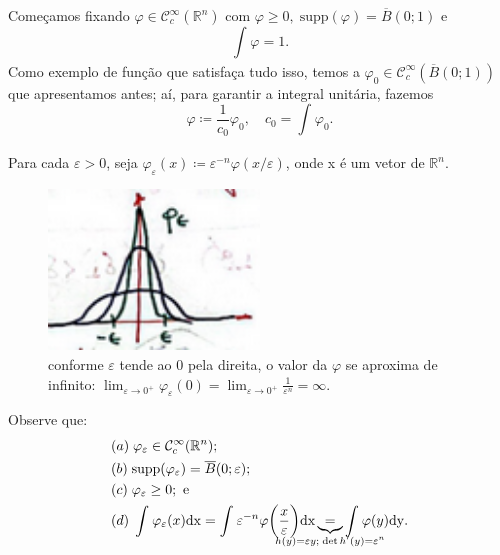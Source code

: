 \documentclass[../distribution_theory_notes.tex]{subfiles}
\begin{document}
 \begin{proof*}
   Começamos fixando \(\varphi \in \mathcal{C}_{c}^{\infty}(\mathbb{R}^{n})\) com \(\varphi \geq 0,\; \mathrm{supp}(\varphi )=\overline{B}(0;1)\) e 
     \[
       \int_{}^{}\varphi = 1.
     \]
     Como exemplo de função que satisfaça tudo isso, temos a \(\varphi_{0}\in \mathcal{C}_{c}^{\infty}(\overline{B}(0;1))\) que apresentamos antes; aí, para garantir a integral unitária, fazemos 
       \[
         \varphi \coloneqq \frac{1}{c_{0}}\varphi_{0},\quad c_{0}= \int_{}^{}\varphi_{0}.
       \]

       Para cada \(\varepsilon >0\), seja \(\varphi_{\varepsilon }(x)\coloneqq \varepsilon^{-n}\varphi(x/\varepsilon )\), onde x é um vetor de \(\mathbb{R}^{n}\). 
      \begin{figure}[H]
      \begin{center}
      \includegraphics[height=0.5\textheight, width=0.5\textwidth, keepaspectratio]{./Images/phi_epsilon_09.png}
      \end{center}
      \caption{conforme \(\varepsilon \) tende ao 0 pela direita, o valor da \(\varphi \) se aproxima de infinito: \(\lim_{\varepsilon \to 0^{+}}\varphi_{\varepsilon }(0)=\lim_{\varepsilon \to 0^{+}}\frac{1}{\varepsilon^{n}}=\infty.\)}
      \end{figure}

       Observe que: 
      \begin{align*}
        &(a)\; \varphi_{\varepsilon }\in \mathcal{C}_{c}^{\infty}(\mathbb{R}^{n}); \\
        &(b)\; \mathrm{supp}(\varphi_{\varepsilon })=\overline{B}(0; \varepsilon );\\
        &(c)\; \varphi_{\varepsilon }\geq 0; \text{ e}\\
        &(d)\; \int_{}^{}\varphi_\varepsilon(x) \mathrm{dx}=\int_{}^{}\varepsilon^{-n}\varphi \biggl(\frac{x}{ \varepsilon }\biggr) \mathrm{dx} \underbrace{=}_{\mathclap{h(y)=\varepsilon y;\; \det{h'(y)}=\varepsilon^{n}}} \int_{}^{}\varphi (y) \mathrm{dy}.
      \end{align*}


\end{proof*}
\end{document}
